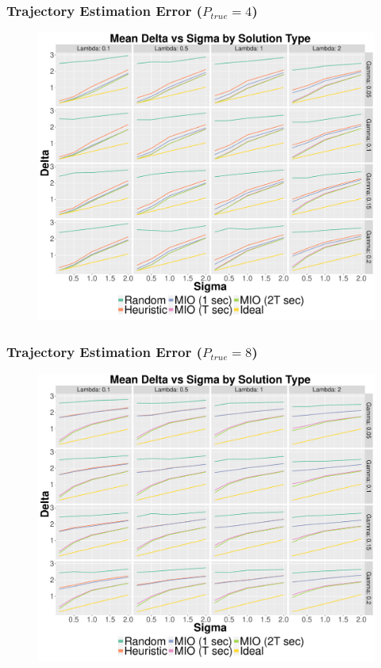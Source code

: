 \documentclass{beamer}
\begin{document}
\begin{frame}
\frametitle{Trajectory Estimation Error ($P_{true}=4$)} 
\begin{figure}[ht]
  \centering
  \includegraphics[width=.7\columnwidth]{../Figures/4_8_Delta}
\end{figure}
\end{frame}

\begin{frame}
\frametitle{Trajectory Estimation Error ($P_{true}=8$)} 
\begin{figure}[ht]
  \centering
  \includegraphics[width=.7\columnwidth]{../Figures/8_8_Delta}
\end{figure}
\end{frame}
\end{document}
